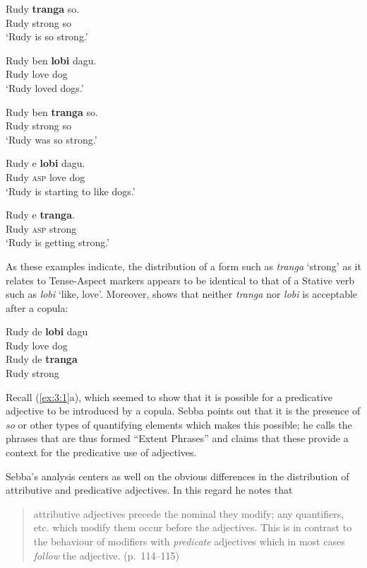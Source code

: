 \ex
\gll Rudy \textbf{tranga} so.\\
          Rudy strong so\\
\glt `Rudy is so strong.'\z \z

\ea%
\label{ex:3:3}
\ea
\gll Rudy ben \textbf{lobi} dagu.\\
         Rudy {\TNS} love dog \\
\glt `Rudy loved dogs.'

\ex
\gll Rudy ben \textbf{tranga} so.\\
         Rudy {\TNS} strong so\\
\glt `Rudy was so strong.'\z \z

\ea%
\label{ex:3:4}
\ea
\gll Rudy                    e \textbf{lobi} dagu.\\
          Rudy \textsc{asp} love dog\\
\glt `Rudy is starting to like dogs.'

\ex
\gll Rudy                  e \textbf{tranga}. \\
        Rudy \textsc{asp} strong\\
\glt `Rudy is getting strong.'\z \z

As these examples indicate, the distribution of a form such as
\textit{tranga} `strong' as it relates to Tense-Aspect markers
appears to be identical to that of a Stative verb such as
\textit{lobi} `like, love'.  Moreover,  shows that neither
\textit{tranga} nor \textit{lobi} is acceptable after a copula:

\ea%
\label{ex:3:5}

\ea
\gll  *Rudy de \textbf{lobi} dagu\\
           Rudy {\COP} love dog\\
\ex
\gll *Rudy de \textbf{tranga}\\
           Rudy {\COP} strong\\
\z \z

Recall (\ref{ex:3:1}a), which seemed to show that it is possible for a
predicative adjective to be introduced by a copula.  Sebba points out
that it is the presence of \textit{so} or other types of quantifying elements
which makes this possible; he calls the phrases that are thus formed
“Extent Phrases” and claims that these provide a context for the
predicative use of adjectives.

Sebba’s analysis centers as well on the obvious differences in the
distribution of attributive and predicative adjectives.  In this
regard he notes that

\begin{quote}
attributive adjectives precede the nominal they modify; any
quantifiers, etc. which modify them occur before the adjectives.  This
is in contrast to the behaviour of modifiers with \textit{predicate}
adjectives which in most cases \textit{follow} the adjective. (p.~114--115)\end{quote}

